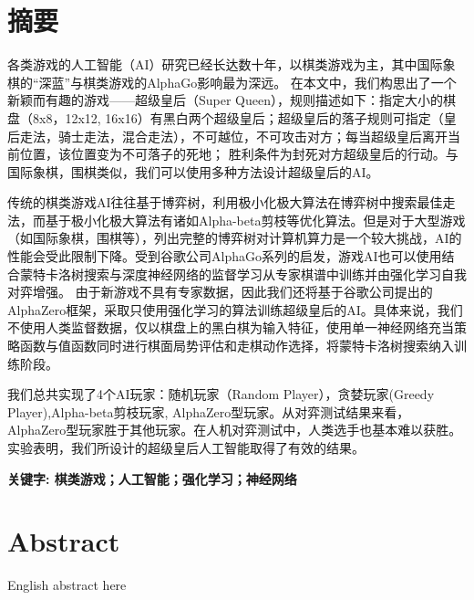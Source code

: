 \chapter*{摘要}

各类游戏的人工智能（AI）研究已经长达数十年，以棋类游戏为主，其中国际象棋的“深蓝”与棋类游戏的AlphaGo影响最为深远。
在本文中，我们构思出了一个新颖而有趣的游戏——超级皇后（Super Queen），规则描述如下：指定大小的棋盘（8x8，12x12, 16x16）有黑白两个超级皇后；超级皇后的落子规则可指定（皇后走法，骑士走法，混合走法），不可越位，不可攻击对方；每当超级皇后离开当前位置，该位置变为不可落子的死地；
胜利条件为封死对方超级皇后的行动。与国际象棋，围棋类似，我们可以使用多种方法设计超级皇后的AI。


传统的棋类游戏AI往往基于博弈树，利用极小化极大算法在博弈树中搜索最佳走法，而基于极小化极大算法有诸如Alpha-beta剪枝等优化算法。但是对于大型游戏（如国际象棋，围棋等），列出完整的博弈树对计算机算力是一个较大挑战，AI的性能会受此限制下降。受到谷歌公司AlphaGo系列的启发，游戏AI也可以使用结合蒙特卡洛树搜索与深度神经网络的监督学习从专家棋谱中训练并由强化学习自我对弈增强。
由于新游戏不具有专家数据，因此我们还将基于谷歌公司提出的AlphaZero框架，采取只使用强化学习的算法训练超级皇后的AI。具体来说，我们不使用人类监督数据，仅以棋盘上的黑白棋为输入特征，使用单一神经网络充当策略函数与值函数同时进行棋面局势评估和走棋动作选择，将蒙特卡洛树搜索纳入训练阶段。


我们总共实现了4个AI玩家：随机玩家（Random Player），贪婪玩家(Greedy Player),Alpha-beta剪枝玩家, AlphaZero型玩家。从对弈测试结果来看，AlphaZero型玩家胜于其他玩家。在人机对弈测试中，人类选手也基本难以获胜。实验表明，我们所设计的超级皇后人工智能取得了有效的结果。
\par\textbf{关键字: 棋类游戏；人工智能；强化学习；神经网络}
\chapter*{Abstract}

English abstract here
